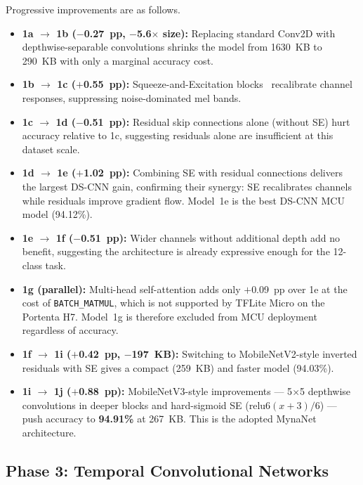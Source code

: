 \documentclass[final,5p,times,twocolumn,nolinenum]{elsarticle}
\begin{document}
Progressive improvements are as follows.
\begin{itemize}
  \item \textbf{1a $\to$ 1b ($-$0.27~pp, $-$5.6$\times$ size):} Replacing
        standard Conv2D with depthwise-separable convolutions shrinks the
        model from 1630~KB to 290~KB with only a marginal accuracy cost.
  \item \textbf{1b $\to$ 1c ($+$0.55~pp):} Squeeze-and-Excitation
        blocks~\cite{hu2018squeeze} recalibrate channel responses,
        suppressing noise-dominated mel bands.
  \item \textbf{1c $\to$ 1d ($-$0.51~pp):} Residual skip connections alone
        (without SE) hurt accuracy relative to 1c, suggesting residuals
        alone are insufficient at this dataset scale.
  \item \textbf{1d $\to$ 1e ($+$1.02~pp):} Combining SE with residual
        connections delivers the largest DS-CNN gain, confirming their
        synergy: SE recalibrates channels while residuals improve gradient
        flow. Model~1e is the best DS-CNN MCU model (94.12\%).
  \item \textbf{1e $\to$ 1f ($-$0.51~pp):} Wider channels without
        additional depth add no benefit, suggesting the architecture is
        already expressive enough for the 12-class task.
  \item \textbf{1g (parallel):} Multi-head self-attention adds only
        $+$0.09~pp over 1e at the cost of \texttt{BATCH\_MATMUL}, which is
        not supported by TFLite Micro on the Portenta H7. Model~1g is
        therefore excluded from MCU deployment regardless of accuracy.
  \item \textbf{1f $\to$ 1i ($+$0.42~pp, $-$197~KB):} Switching to
        MobileNetV2-style inverted residuals with SE gives a compact
        (259~KB) and faster model (94.03\%).
  \item \textbf{1i $\to$ 1j ($+$0.88~pp):} MobileNetV3-style improvements
        --- 5$\times$5 depthwise convolutions in deeper blocks and
        hard-sigmoid SE (relu6$(x+3)/6$) --- push accuracy to
        \textbf{94.91\%} at 267~KB. This is the adopted MynaNet
        architecture.
\end{itemize}

\subsection{Phase 3: Temporal Convolutional Networks}
\label{sec:tcn}
\end{document}

